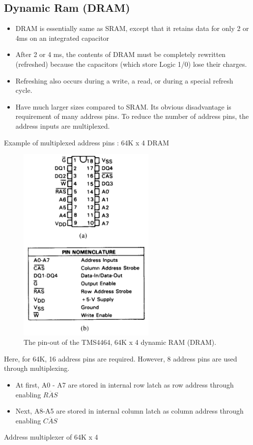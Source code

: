 \subsection{Dynamic Ram (DRAM)}
\begin{itemize}
  \item DRAM is essentially same as SRAM, except that it retains data for only 2 or 4ms on an integrated capacitor
  \item After 2 or 4 ms, the contents of DRAM must be completely rewritten (refreshed) because the capacitors (which store Logic 1/0) lose their charges.
  \item Refreshing also occurs during a write, a read, or during a special refresh cycle.
  \item Have much larger sizes compared to SRAM. Its obvious disadvantage is requirement of many address pins. To reduce the number of address pins, the address inputs are multiplexed.
\end{itemize}
\newpage
Example of multiplexed address pins : 64K x 4 DRAM
\begin{figure}[h!]
  \centering
  \includegraphics[width = 0.6\textwidth]{./figures/DRAM.png}
  \caption{The pin-out of the TMS4464, 64K x 4 dynamic RAM (DRAM).}
  \label{}
\end{figure}
Here, for 64K, 16 address pins are required. However, 8 address pins are used through multiplexing.
\begin{itemize}
  \item At first, A0 - A7 are stored in internal row latch as row address through enabling $\overline{RAS}$
  \item Next, A8-A5 are stored in internal column latch as column address through enabling $\overline{CAS}$
\end{itemize}
Address multiplexer of 64K x 4

